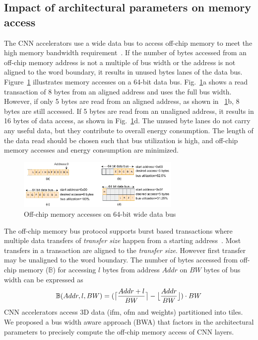 \documentclass[a4paper,10pt]{article}
\DeclarePairedDelimiter{\ceil}{\lceil}{\rceil}
\DeclarePairedDelimiter\floor{\lfloor}{\rfloor}
\newcommand{\numBytesOffChip}{\mathbb{B}}
\newcommand{\busWidth}{BW}
\newcommand{\dataLength}{l}
\newcommand{\addressSym}{Addr}
\begin{document}
\subsection{Impact of architectural parameters on memory access}\label{sec:OffChipAccessModel}
The CNN accelerators use a wide data bus to access off-chip memory to meet the high memory bandwidth requirement~\cite{Chen2016EyerissAS,chen2014diannao}. If the number of bytes accessed from an off-chip memory address is not a multiple of bus width or the address is not aligned to the word boundary, it results in unused bytes lanes of the data bus. Figure~\ref{fig:AXI_AccesseOn64BitDataBus} illustrates memory accesses on a 64-bit data bus.  Fig.~\ref{fig:AXI_AccesseOn64BitDataBus}a shows a read transaction of 8 bytes from an aligned address and uses the full bus width. However, if only 5 bytes are read from an aligned address, as shown in \figurename~\ref{fig:AXI_AccesseOn64BitDataBus}b, 8 bytes are still accessed. If 5 bytes are read from an unaligned address, it results in 16 bytes of data access, as shown in Fig.~\ref{fig:AXI_AccesseOn64BitDataBus}d. The unused byte lanes do not carry any useful data, but they contribute to overall energy consumption. The length of the data read should be chosen such that bus utilization is high, and off-chip memory accesses and energy consumption are minimized.
\begin{figure}[!htb]
	\centering
	\includegraphics[width=0.7\textwidth]{./images/BurstTranscationOnAXI}
	\caption{Off-chip memory accesses on 64-bit wide data bus}
	\label{fig:AXI_AccesseOn64BitDataBus}
\end{figure}
The off-chip memory bus protocol supports burst based transactions where multiple data transfers of \emph{transfer size} happen from a starting address~\cite{AxiProtocolSpec}. Most transfers in a transaction are aligned to the \emph{transfer size}. However first transfer may be unaligned to the word boundary. 
The number of bytes accessed from off-chip memory ($\numBytesOffChip$) for accessing $\dataLength$ bytes from address $\addressSym$ on $\busWidth$ bytes of bus width can be expressed as
\begin{equation}\label{eq:accessfromUnalignedAddr}
	\begin{aligned}
		\numBytesOffChip(\addressSym,\dataLength,\busWidth)=(\ceil[\big]{\frac{\addressSym+\dataLength}{\busWidth}}-\floor[\big]{\frac{\addressSym}{\busWidth}})\cdot{\busWidth}
	\end{aligned}
\end{equation}
CNN accelerators access 3D data (ifm, ofm and weights) partitioned into tiles. We proposed a bus width aware approach (BWA) that factors in the architectural parameters to precisely compute the off-chip memory access of CNN layers.
\end{document}
